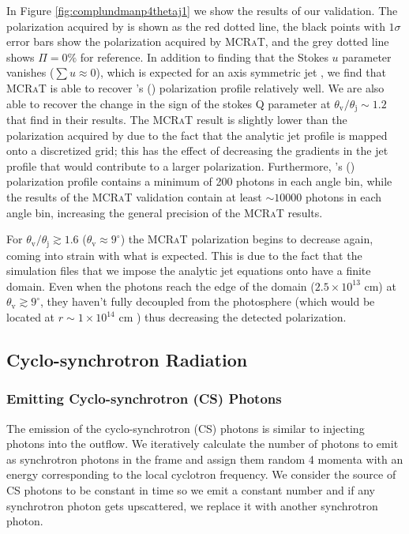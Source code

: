 \documentclass[12pt,a4paper]{article}
\newcommand{\mcrat}{\textsc{MCRaT}}
\begin{document}
In Figure \ref{fig:complundmanp4thetaj1} we show the results of our validation. The polarization acquired by \cite{lundman2014polarization} is shown as the red dotted line, the black points with $1\sigma$ error bars show the polarization acquired by \mcrat{}, and the grey dotted line shows $\Pi=0\%$ for reference. In addition to finding that the Stokes $u$ parameter vanishes ($\sum u \approx 0$), which is expected for an axis symmetric jet \citep{ito_polarization, lundman2014polarization}, we find that \mcrat{} is able to recover \citeauthor{lundman2014polarization}'s (\citeyear{lundman2014polarization}) polarization profile relatively well. {We are also able to recover the change in the sign of the stokes Q parameter at $\theta_{\mathrm{v}}/\theta_{\mathrm{j}} \sim 1.2$ that \cite{lundman2014polarization} find in their results.
The \mcrat{} result is slightly lower than the polarization acquired by \cite{lundman2014polarization} due to the fact that the analytic jet profile is mapped onto a discretized grid; this has the effect of decreasing the gradients in the jet profile that would contribute to a larger polarization. 
Furthermore, \citeauthor{lundman2014polarization}'s (\citeyear{lundman2014polarization}) polarization profile contains a minimum of 200 photons in each angle bin, while the results of the \mcrat{} validation contain at least $\sim 10000$ photons in each angle bin, increasing the general precision of the \mcrat{} results. }

For $\theta_{\mathrm{v}}/\theta_{\mathrm{j}} \gtrsim 1.6$ ($\theta_{\mathrm{v}} \approx 9^\circ$) the \mcrat{} polarization begins to decrease again, coming into strain with what is expected. This is due to the fact that the simulation files that we impose the analytic jet equations onto have a finite domain. Even when the photons reach the edge of the domain ($2.5 \times 10^{13}$ cm) at $\theta_{\mathrm{v}} \gtrsim 9^\circ$, they haven't fully decoupled from the photosphere (which would be located at $r\sim 1\times 10^{14}$ cm \citep{lundman2014polarization}) thus decreasing the detected polarization. 

\subsection{Cyclo-synchrotron Radiation}\label{cyclo-synch}
\subsubsection{Emitting Cyclo-synchrotron (CS) Photons}
The emission of the cyclo-synchrotron (CS) photons is similar to injecting photons into the outflow. We iteratively calculate the number of photons to emit as synchrotron photons in the frame and assign them random 4 momenta with an energy corresponding to the local cyclotron frequency. We consider the source of CS photons to be constant in time so we emit a constant number and if any synchrotron photon gets upscattered, we replace it with another synchrotron photon. 
\end{document}
